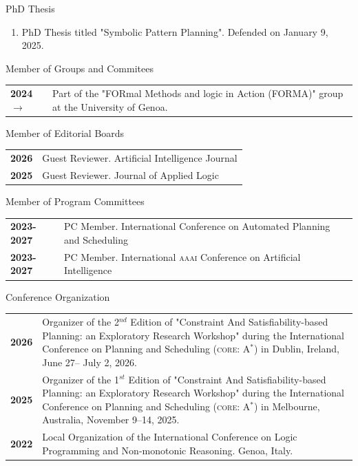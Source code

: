 \documentclass{resume} %
\begin{document}
 \begin{rSection}{PhD Thesis}
  \begin{enumerate}[leftmargin=5mm]
	\item[T1] PhD Thesis titled "Symbolic Pattern Planning". Defended on January 9, 2025.	
	\end{enumerate}
 \end{rSection}

  \begin{rSection}{Member of Groups and Commitees}
	\begin{tabularx}{0.95\textwidth} {lp{14cm}}
 \textbf{2024$\rightarrow$} & Part of the "FORmal Methods and logic in Action (FORMA)" group at the University of Genoa.
  \end{tabularx}
 \end{rSection}

  \begin{rSection}{Member of Editorial Boards}
	\begin{tabularx}{0.95\textwidth} {lp{14cm}}
 \textbf{2026} & Guest Reviewer. Artificial Intelligence Journal \\
 \textbf{2025} & Guest Reviewer. Journal of Applied Logic
  \end{tabularx}
 \end{rSection}
 
 
  \begin{rSection}{Member of Program Committees}
	\begin{tabularx}{0.95\textwidth} {lp{14cm}}
 \textbf{2023-2027} & PC Member. International Conference on Automated Planning and Scheduling \\
 \textbf{2023-2027} & PC Member. International \textsc{aaai} Conference on Artificial Intelligence 
  \end{tabularx}
 \end{rSection}
 
   \begin{rSection}{Conference Organization}
	\begin{tabularx}{0.95\textwidth} {lp{14cm}}
 \textbf{2026} & Organizer of the 2$^{nd}$ Edition of "Constraint And Satisfiability-based Planning: an Exploratory Research Workshop" during the International Conference on Planning and Scheduling (\textsc{core}: A$^*$) in Dublin, Ireland, June 27– July 2, 2026. \\
 \textbf{2025} & Organizer of the 1$^{st}$ Edition of "Constraint And Satisfiability-based Planning: an Exploratory Research Workshop" during the International Conference on Planning and Scheduling (\textsc{core}: A$^*$) in Melbourne, Australia, November 9–14, 2025. \\
  \textbf{2022} & Local Organization of the International Conference on Logic Programming and Non-monotonic Reasoning. Genoa, Italy.
  \end{tabularx}
 \end{rSection}
\end{document}
